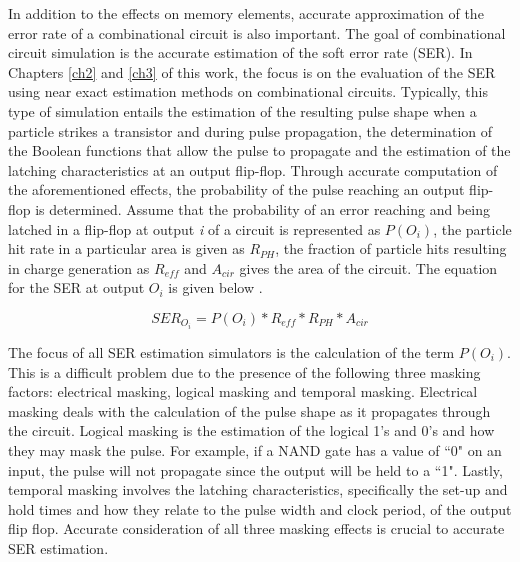 In addition to the effects on memory elements, accurate approximation of the error rate of a combinational circuit is also important. The goal of combinational circuit simulation is the accurate estimation of the soft error rate (SER). In Chapters \ref{ch2} and \ref{ch3} of this work, the focus is on the evaluation of the SER using near exact estimation methods on combinational circuits. Typically, this type of simulation entails the estimation of the resulting pulse shape when a particle strikes a transistor and during pulse propagation, the determination of the Boolean functions that allow the pulse to propagate and the estimation of the latching characteristics at an output flip-flop. Through accurate computation of the aforementioned effects, the probability of the pulse reaching an output flip-flop is determined. Assume that the probability of an error reaching and being latched in a flip-flop at output \textit{i} of a circuit is represented as \textit{$P(O_i)$}, the particle hit rate in a particular area is given as \textit{$R_{PH}$}, the fraction of particle hits resulting in charge generation as \textit{$R_{eff}$} and \textit{$A_{cir}$} gives the area of the circuit. The equation for the SER at output \textit{$O_i$} is given below \cite{METSys}.

\begin{equation}\label{SER_eq}
SER_{O_i} = P(O_i) * R_{eff} * R_{PH} * A_{cir}
\end{equation}

The focus of all SER estimation simulators is the calculation of the term \textit{$P(O_i)$}. This is a difficult problem due to the presence of the following three masking factors: electrical masking, logical masking and temporal masking. Electrical masking deals with the calculation of the pulse shape as it propagates through the circuit. Logical masking is the estimation of the logical 1's and 0's and how they may mask the pulse. For example, if a NAND gate has a value of ``0" on an input, the pulse will not propagate since the output will be held to a ``1". Lastly, temporal masking involves the latching characteristics, specifically the set-up and hold times and how they relate to the pulse width and clock period, of the output flip flop. Accurate consideration of all three masking effects is crucial to accurate SER estimation.

